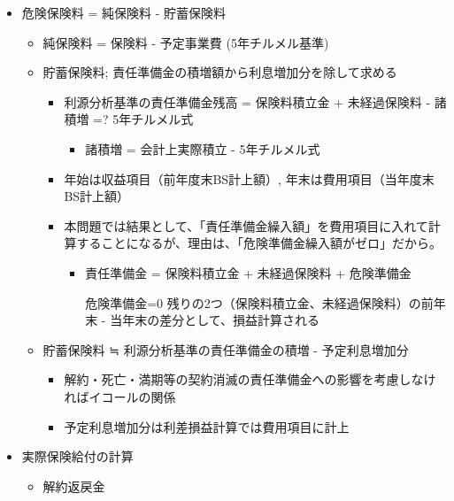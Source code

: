 \documentclass[report,gutter=10mm,fore-edge=10mm,uplatex,dvipdfmx]{jlreq}
\begin{document}
\begin{itemize}
\tightlist
\item
  危険保険料 = 純保険料 - 貯蓄保険料

  \begin{itemize}
  \tightlist
  \item
    純保険料 = 保険料 - 予定事業費 (5年チルメル基準)
  \item
    貯蓄保険料; 責任準備金の積増額から利息増加分を除して求める

    \begin{itemize}
    \tightlist
    \item
      利源分析基準の責任準備金残高 = 保険料積立金 + 未経過保険料 -
      諸積増 =? 5年チルメル式

      \begin{itemize}
      \tightlist
      \item
        諸積増 = 会計上実際積立 - 5年チルメル式
      \end{itemize}
    \item
      年始は収益項目（前年度末BS計上額）,
      年末は費用項目（当年度末BS計上額）
    \item
      本問題では結果として、「責任準備金繰入額」を費用項目に入れて計算することになるが、理由は、「危険準備金繰入額がゼロ」だから。

      \begin{itemize}
      \tightlist
      \item
        責任準備金 = 保険料積立金 + 未経過保険料 + 危険準備金

          危険準備金=0
          残りの2つ（保険料積立金、未経過保険料）の前年末 -
          当年末の差分として、損益計算される
      \end{itemize}
    \end{itemize}
  \item
    貯蓄保険料 ≒ 利源分析基準の責任準備金の積増 - 予定利息増加分

    \begin{itemize}
    \tightlist
    \item
      解約・死亡・満期等の契約消滅の責任準備金への影響を考慮しなければイコールの関係
    \item
      予定利息増加分は利差損益計算では費用項目に計上
    \end{itemize}
  \end{itemize}
\item
  実際保険給付の計算

  \begin{itemize}
  \item
    解約返戻金


\end{itemize}
\end{itemize}
\end{document}
